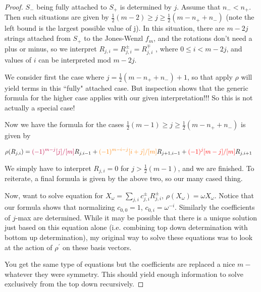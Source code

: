 \documentclass{article}
\begin{document}
\begin{proof}
$S_{-}$ being fully attached to $S_{+}$ is determined by $j$.  Assume that $n_{-}<n_{+} $. Then such situations are given by $\frac{1}{2}(m-2)\ge j\ge \frac{1}{2}(m-n_{+}+n_{-})$ (note the left bound is the largest possible value of j).  In this situation, there are $m-2j$ strings attached from $S_{+}$ to the Jones-Wenzl $f_{m}$, and the rotations don't need a plus or minus, so we interpret $R_{j,i}=R^{\pm}_{j,i}=R^{\mp}_{j,i}$ , where $0\le i <m-{2j}$, and values of $i$ can be interpreted mod $m-2j$. 

We consider first the case where $j=\frac{1}{2}(m-n_{+}+n_{-})+1$, so that apply $\rho$ will yield terms in this ``fully" attached case.  But inspection shows that the generic formula for the higher case applies with our given interpretation!!! So this is not actually a special case!



Now we have the formula for the cases $\frac{1}{2}(m-1)\ge j\ge \frac{1}{2}(m-n_{+}+n_{-})$ is given by

\begin{align*}
\rho(R_{j,i}) 
&= 
\textcolor{purple}{(-1)^{m-j}[j]/[m]} R_{j,i-1}
+\textcolor{orange}{(-1)^{m-i-j} [i+j]/[m] } R_{j+1,i-1}
+\textcolor{red}{(-1)^j [m-j]/[m]} R_{j,i+1}
\end{align*}

We simply have to interpret $R_{j,i}=0$ for $j>\frac{1}{2}(m-1)$, and we are finished.  To reiterate, a final formula is given by the above two, so our many cased thing. 


Now, want to solve equation for $X_{\omega}=\sum_{j,i} c^{\pm}_{j,i}R^{\pm}_{j,i}$, $\rho(X_{\omega})=\omega X_{\omega}$.  Notice that our formula shows that normalizing $c_{0,0}=1$, $c_{0,i}=\omega^{-i}$.  Similarly the coefficients of $j$-max are determined.  While it may be possible that there is a unique solution just based on this equation alone (i.e. combining top down determination with bottom up determination), my original way to solve these equations was to look at the action of $\rho^{\prime}$ on these basis vectors.


You get the same type of equations but the coefficients are replaced a nice $m-$ whatever they were symmetry.  This should yield enough information to solve exclusively from the top down recursively. 




\end{proof}
\end{document}
